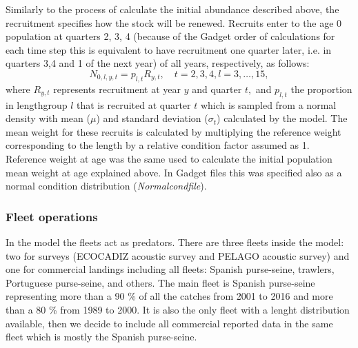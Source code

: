 \documentclass[review]{elsarticle}
\begin{document}
Similarly to the process of calculate the initial abundance described above, the recruitment specifies how the stock will be renewed. Recruits enter to the age 0 population at quarters 2, 3, 4  (because of the Gadget order of calculations for each time step this is equivalent to have recruitment one quarter later, i.e. in quarters 3,4 and 1 of the next year) of all years, respectively, as follows: $$N_{0,l,y,t}=p_{l,t}R_{y,t}, \quad t=2,3,4, l=3, \dots,15,$$ where $R_{y,t}$ represents recruitment at year $y$ and quarter $t,$ and $p_{l,t}$ the proportion in lengthgroup $l$ that is recruited at quarter $t$ which is sampled from a normal density with mean ($\mu$) and standard deviation ($\sigma_t$) calculated by the model. The mean weight for these recruits is calculated by multiplying the reference weight corresponding to the length by a relative condition factor assumed as 1. Reference weight at age was the same used to calculate the initial population mean weight at age explained above.  In Gadget files this was specified also as a normal condition distribution (\textit{Normalcondfile}).


% 
% 
% 

\subsubsection*{Fleet operations}

In the model the fleets act as predators.  There are three fleets inside the model: two for surveys (ECOCADIZ acoustic survey and PELAGO acoustic survey) and one for commercial landings including all fleets: Spanish purse-seine, trawlers, Portuguese purse-seine,  and others. The main fleet  is Spanish purse-seine representing more than a 90 \% of all the catches from 2001 to 2016 and more than a 80 \% from 1989 to 2000. It is also the only fleet with a lenght distribution available, then we decide to include all commercial reported data in the same fleet which is mostly the Spanish purse-seine. 
\end{document}
